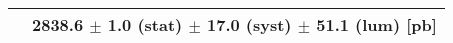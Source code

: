 \begin{tabular}{lc}
\hline
                               & 2838.6 $\pm$ 1.0 (stat) $\pm$ 17.0 (syst) $\pm$ 51.1 (lum) [pb]  \\
\hline
\end{tabular}
